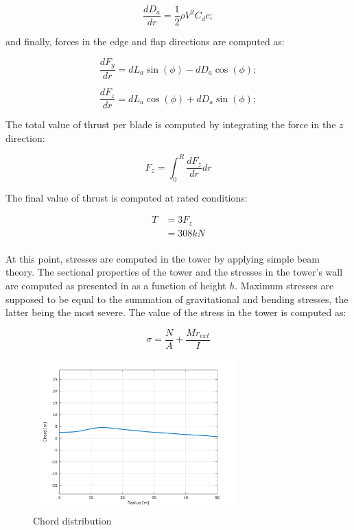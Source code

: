 \begin{equation}
    \frac{dD_a}{dr}  = \frac{1}{2} \rho V ^ 2 C_d c;
\end{equation}

and finally, forces in the edge and flap directions are computed as:

\begin{equation}
    \frac{dF_y}{dr}  = dL_a \sin(\phi) - dD_a \cos(\phi);
\end{equation}

\begin{equation}
    \frac{dF_z}{dr}  = dL_a \cos(\phi) + dD_a \sin(\phi);
\end{equation}

The total value of thrust per blade is computed by integrating the force in the $z$ direction:

\begin{equation}
    F_z = \int_{0}^{R} \frac{dF_z}{dr} dr
\end{equation}

The final value of thrust is computed at rated conditions:

\begin{align}
    T &= 3 F_z \\
    &= 308 kN \\ \nonumber
\end{align}

At this point, stresses are computed in the tower by applying simple beam theory. The sectional properties of the tower and the stresses in the tower's wall are computed as presented in \cite{Bispl} as a function of height $h$. Maximum stresses are supposed to be equal to the summation of gravitational and bending stresses, the latter being the most severe. The value of the stress in the tower is computed as:

\begin{equation}
    \sigma = \frac{N}{A} + \frac{M r_{ext}}{I}
\end{equation}

\begin{figure}[H]
\centering
\includegraphics[width=0.7\textwidth]{Images/chord.png} 
\caption{Chord distribution}\label{fig:chord}
\end{figure}